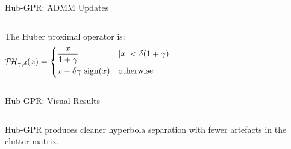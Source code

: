 \begin{frame}{Hub-GPR: ADMM Updates \skipbadge{}}
\begin{columns}[T]
      \vspace{0.3em}
      \begin{shibuiproof}
        The Huber proximal operator is:
        \[
          \mathcal{P\!H}_{\gamma,\delta}(x)
          =
          \begin{cases}
            \dfrac{x}{1+\gamma}
              & \lvert x\rvert < \delta(1+\gamma) \\[6pt]
            x - \delta\gamma\,\operatorname{sign}(x)
              & \text{otherwise}
          \end{cases}
        \]
      \end{shibuiproof}
  \end{columns}
\end{frame}

\begin{frame}{Hub-GPR: Visual Results}
  \begin{columns}[T]
      \centering

      \centering

      \centering
  \end{columns}

  \vspace{0.5em}
  Hub-GPR produces cleaner hyperbola separation with
  fewer artefacts in the clutter matrix.

  \vspace{0.6em}
  \begin{columns}[T]
      \centering

      \centering
  \end{columns}
\end{frame}

